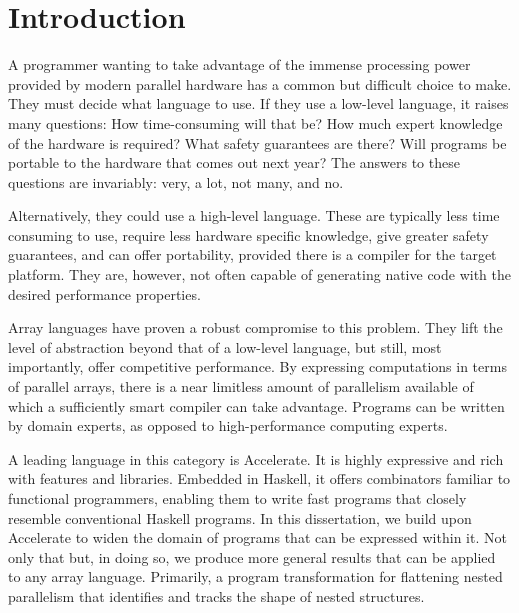 \chapter{Introduction}

A programmer wanting to take advantage of the immense processing power provided by modern parallel hardware has a common but difficult choice to make. They must decide what language to use. If they use a low-level language, it raises many questions: How time-consuming will that be? How much expert knowledge of the hardware is required?  What safety guarantees are there? Will programs be portable to the hardware that comes out next year? The answers to these questions are invariably: very, a lot, not many, and no.

Alternatively, they could use a high-level language. These are typically less time consuming to use, require less hardware specific knowledge, give greater safety guarantees, and can offer portability, provided there is a compiler for the target platform. They are, however, not often capable of generating native code with the desired performance properties.

Array languages have proven a robust compromise to this problem. They lift the level of abstraction beyond that of a low-level language, but still, most importantly, offer competitive performance. By expressing computations in terms of parallel arrays, there is a near limitless amount of parallelism available of which a sufficiently smart compiler can take advantage. Programs can be written by domain experts, as opposed to high-performance computing experts.

A leading language in this category is Accelerate. It is highly expressive and rich with features and libraries. Embedded in Haskell, it offers combinators familiar to functional programmers, enabling them to write fast programs that closely resemble conventional Haskell programs. In this dissertation, we build upon Accelerate to widen the domain of programs that can be expressed within it. Not only that but, in doing so, we produce more general results that can be applied to any array language. Primarily, a program transformation for flattening nested parallelism that identifies and tracks the shape of nested structures.

